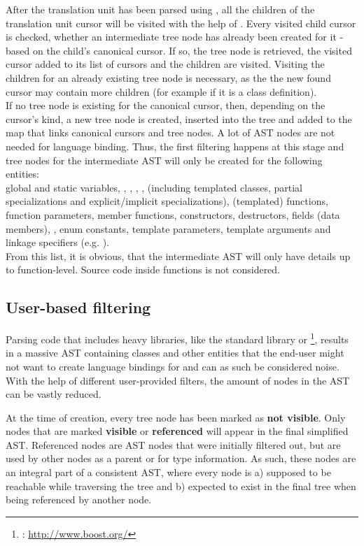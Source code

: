 After the translation unit has been parsed using , all the children of the translation unit cursor will be visited with the help of \linebreak{}. Every visited child cursor is checked, whether an intermediate tree node has already been created for it - based on the child's canonical cursor. If so, the tree node is retrieved, the visited cursor added to its list of cursors and the children are visited. Visiting the children for an already existing tree node is necessary, as the the new found cursor may contain more children (for example if it is a class definition).\\
If no tree node is existing for the canonical cursor, then, depending on the cursor's kind, a new tree node is created, inserted into the tree and added to the map that links canonical cursors and tree nodes. A lot of AST nodes are not needed for language binding. Thus, the first filtering happens at this stage and tree nodes for the intermediate AST will only be created for the following  entities:\\global and static variables, , , , ,  (including templated classes, partial specializations and explicit/implicit specializations), (templated) functions, function parameters, member functions, constructors, destructors, fields (data members), , enum constants, template parameters, template arguments and linkage specifiers (e.g. ).\\
From this list, it is obvious, that the intermediate AST will only have details up to function-level. Source code inside functions is not considered. 

\subsection{User-based filtering}

Parsing code that includes heavy libraries, like the  standard library or \footnote{: \url{http://www.boost.org/}}, results in a massive AST containing classes and other entities that the end-user might not want to create language bindings for and can as such be considered noise. With the help of different user-provided filters, the amount of nodes in the AST can be vastly reduced. 

At the time of creation, every tree node has been marked as \textbf{not visible}. Only nodes that are marked \textbf{visible} or \textbf{referenced} will appear in the final simplified AST. Referenced nodes are AST nodes that were initially filtered out, but are used by other nodes as a parent or for type information. As such, these nodes are an integral part of a consistent AST, where every node is a) supposed to be reachable while traversing the tree and b) expected to exist in the final tree when being referenced by another node.

